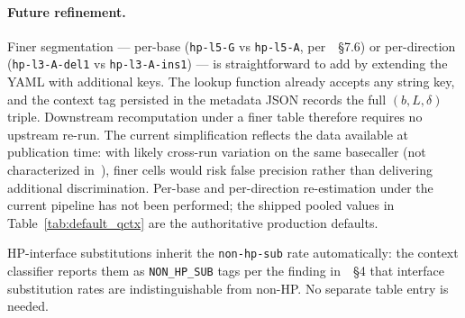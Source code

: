 \documentclass[11pt]{article}
\begin{document}
\paragraph{Future refinement.} Finer segmentation --- per-base
(\texttt{hp-l5-G} vs \texttt{hp-l5-A}, per~\cite{hp_paper}~\S 7.6) or
per-direction (\texttt{hp-l3-A-del1} vs \texttt{hp-l3-A-ins1}) --- is
straightforward to add by extending the YAML with additional keys. The
lookup function already accepts any string key, and the context tag persisted
in the metadata JSON records the full $(b, L, \delta)$ triple. Downstream
recomputation under a finer table therefore requires no upstream re-run. The
current simplification reflects the data available at publication time: with
likely cross-run variation on the same basecaller (not characterized
in~\cite{hp_paper}), finer cells would risk false precision rather than
delivering additional discrimination. Per-base and per-direction
re-estimation under the current pipeline has not been performed; the shipped
pooled values in Table~\ref{tab:default_qctx} are the authoritative
production defaults.

HP-interface substitutions inherit the \texttt{non-hp-sub} rate automatically:
the context classifier reports them as \texttt{NON\_HP\_SUB} tags per the
finding in~\cite{hp_paper}~\S 4 that interface substitution rates are
indistinguishable from non-HP. No separate table entry is needed.
\end{document}
